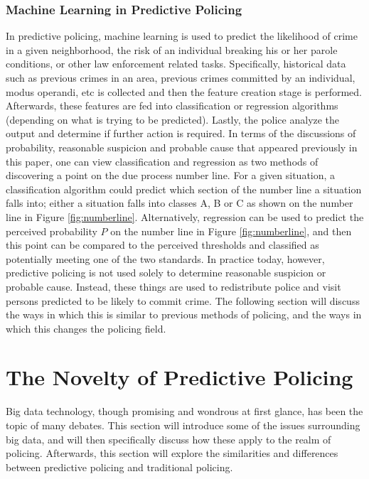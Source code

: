 \documentclass[12pt]{article} %
\begin{document}
\subsubsection{Machine Learning in Predictive Policing}
In predictive policing, machine learning is used to predict the likelihood of crime in a given neighborhood, the risk of an individual breaking his or her parole conditions, or other law enforcement related tasks. Specifically, historical data such as previous crimes in an area, previous crimes committed by an individual, modus operandi, etc is collected and then the feature creation stage is performed. Afterwards, these features are fed into classification or regression algorithms (depending on what is trying to be predicted). Lastly, the police analyze the output and determine if further action is required. In terms of the discussions of probability, reasonable suspicion and probable cause that appeared previously in this paper, one can view classification and regression as two methods of discovering a point on the due process number line. For a given situation, a classification algorithm could predict which section of the number line a situation falls into; either a situation falls into classes A, B or C as shown on the number line in Figure \ref{fig:numberline}. Alternatively, regression can be used to predict the perceived probability $P$ on the number line in Figure \ref{fig:numberline}, and then this point can be compared to the perceived thresholds and classified as potentially meeting one of the two standards. In practice today, however, predictive policing is not used solely to determine reasonable suspicion or probable cause. Instead, these things are used to redistribute police and visit persons predicted to be likely to commit crime. The following section will discuss the ways in which this is similar to previous methods of policing, and the ways in which this changes the policing field.

\section{The Novelty of Predictive Policing}\label{sec:oldvnew} %
Big data technology, though promising and wondrous at first glance, has been the topic of many debates. This section will introduce some of the issues surrounding big data, and will then specifically discuss how these apply to the realm of policing. Afterwards, this section will explore the similarities and differences between predictive policing and traditional policing.
\end{document}
